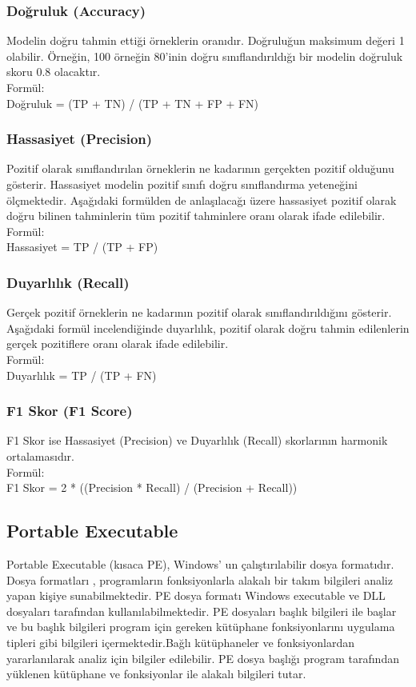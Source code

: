 \documentclass{article}
\begin{document}
\subsubsection{Doğruluk (Accuracy)}
Modelin doğru tahmin ettiği örneklerin oranıdır. Doğruluğun maksimum değeri 1 olabilir. Örneğin, 100 örneğin 80'inin doğru sınıflandırıldığı bir modelin doğruluk skoru 0.8 olacaktır.\\
Formül:\\

Doğruluk = (TP + TN) / (TP + TN + FP + FN)
\subsubsection{Hassasiyet (Precision)}
Pozitif olarak sınıflandırılan örneklerin ne kadarının gerçekten pozitif olduğunu gösterir. Hassasiyet modelin pozitif sınıfı doğru sınıflandırma yeteneğini ölçmektedir. Aşağıdaki formülden de anlaşılacağı üzere hassasiyet pozitif olarak doğru bilinen tahminlerin tüm pozitif tahminlere oranı olarak ifade edilebilir.\\
Formül:\\
Hassasiyet = TP / (TP + FP)
\subsubsection{Duyarlılık (Recall)}
 Gerçek pozitif örneklerin ne kadarının pozitif olarak sınıflandırıldığını gösterir. Aşağıdaki formül incelendiğinde duyarlılık, pozitif olarak doğru tahmin edilenlerin gerçek pozitiflere oranı olarak ifade edilebilir.\\
 Formül:\\
 Duyarlılık = TP / (TP + FN)
 \subsubsection{F1 Skor (F1 Score)}
 F1 Skor ise Hassasiyet (Precision) ve Duyarlılık (Recall) skorlarının harmonik ortalamasıdır.\\
 Formül:\\
 F1 Skor = 2 * ((Precision * Recall) / (Precision + Recall))\cite{P}
 \subsection{Portable Executable}
Portable Executable (kısaca PE), Windows’ un çalıştırılabilir dosya formatıdır. Dosya formatları , programların fonksiyonlarla alakalı bir takım bilgileri analiz yapan kişiye sunabilmektedir. PE dosya formatı Windows executable ve DLL dosyaları tarafından kullanılabilmektedir. PE dosyaları başlık bilgileri ile başlar ve bu başlık bilgileri program için gereken kütüphane fonksiyonlarını uygulama tipleri gibi bilgileri içermektedir.Bağlı kütüphaneler ve fonksiyonlardan yararlanılarak analiz için bilgiler edilebilir. PE dosya 
başlığı program tarafından yüklenen kütüphane ve fonksiyonlar ile alakalı bilgileri tutar.
\cite{PEP}
\end{document}
